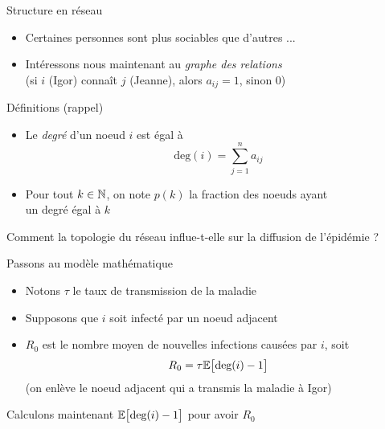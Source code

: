\documentclass[10pt]{beamer}
\begin{document}
\begin{frame}{Structure en réseau}

  \begin{itemize}
    \item Certaines personnes sont plus sociables que d'autres ...
    \item Intéressons nous maintenant au \emph{graphe des relations} \\
      (si $i$ (Igor) connaît $j$ (Jeanne), alors $a_{ij} = 1$, sinon $0$)
  \end{itemize}

  \begin{block}{Définitions (rappel)}
    \begin{itemize}
      \item Le \emph{degré} d'un noeud $i$ est égal à
        \[
          \text{deg}(i) = \sum_{j=1}^n a_{ij}
        \]
        \vspace{-.4cm}
      \item Pour tout $k \in \mathbb{N}$, on note $p(k)$ la fraction des noeuds ayant\\
        un degré égal à $k$
    \end{itemize}
  \end{block}

  Comment la topologie du réseau influe-t-elle sur la diffusion de l'épidémie ?
\end{frame}

\begin{frame}{Passons au modèle mathématique}
  \begin{itemize}
    \item Notons $\tau$ le taux de transmission de la maladie
    \item Supposons que $i$ soit infecté par un noeud adjacent
    \item $R_0$ est le nombre moyen de nouvelles infections causées par $i$,
      soit
      \[
        R_0 = \tau \mathbb{E}\big[\text{deg}(i) - 1\big]
      \]
      (on enlève le noeud adjacent qui a transmis la maladie à Igor)
  \end{itemize}

  Calculons maintenant $\mathbb{E}\big[\text{deg}(i) - 1\big]$ pour avoir $R_0$
\end{frame}
\end{document}
